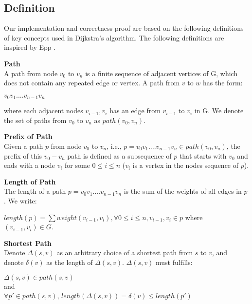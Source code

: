 
\subsection{Definition} \label{definitions}
Our implementation and correctness proof are based on the following definitions of key concepts used in Dijkstra's algorithm. The following definitions are inspired by Epp \cite{discrete}.
\\

\theoremstyle{definition}
\begin{definition}\textbf{Path}\\
A path from node $v_0$ to $v_n$ is a finite sequence of adjacent vertices of G, which does not contain any repeated edge or vertex. A path from $v$ to $w$ has the form: 
\begin{center}
 $v_0v_1....v_{n-1}v_n$ 
\end{center}
where each adjacent nodes $v_{i-1}, v_i$ has an edge from $v_{i-1}$ to $v_i$ in G. We denote the set of paths from $v_0$ to $v_n$ as $path(v_0, v_n)$.
\end{definition}
\tab
\begin{definition}\textbf{Prefix of Path}\\
Given a path $p$ from node $v_0$ to $v_n$, i.e., $p = v_0v_1....v_{n-1}v_n \in path(v_0, v_n)$, the prefix of this $v_0 - v_n$ path is defined as a subsequence of $p$ that starts with $v_0$ and ends with a node $v_i$ for some $0 \leq i \leq n$ ($v_i$ is a vertex in the nodes sequence of $p$). 
\end{definition}
\tab
\begin{definition}\textbf{Length of Path} \\
The length of a path $p = v_0v_1....v_{n-1}v_n$ is the sum of the weights of all edges in $p$. We write: 
\begin{center}
  $length(p) = \sum weight(v_{i-1}, v_i), \forall 0 \leq i \leq n, v_{i-1}, v_i \in p$ where $(v_{i-1}, v_i) \in G$. 
\end{center} 
\end{definition}
\tab
\begin{definition}\textbf{Shortest Path}\\
Denote $\Delta(s, v)$ as an arbitrary choice of a shortest path from $s$ to $v$, and denote $\delta(v)$ as the length of $\Delta(s, v)$. $\Delta(s, v)$ must fulfills: 
\begin{center}
$\Delta(s, v) \in path(s, v)$ 
\\
and 
\\
$\forall p' \in path(s, v)$, $length(\Delta(s, v)) = \delta(v) \leq length(p')$
\end{center}
\end{definition}